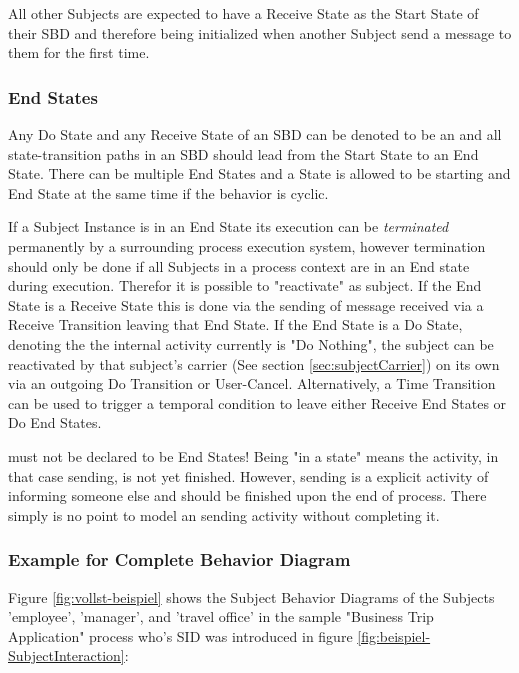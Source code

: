 All other Subjects are expected to have a Receive State as the Start State of their SBD and therefore being initialized when another Subject send a message to them for the first time.

\subsubsection{End States}
\label{sec:endStates}

Any Do State and any Receive State of an SBD can be denoted to be an  and all state-transition paths in an SBD should lead from the Start State to an End State. There can be multiple End States and a State is allowed to be starting and End State at the same time if the behavior is cyclic. 

If a Subject Instance is in an End State its execution can be \textit{terminated} permanently by a surrounding process execution system, however termination should only be done if all Subjects in a process context are in an End state during execution. Therefor it is possible to "reactivate" as subject. If the End State is a Receive State this is done via the sending of message received via a Receive Transition leaving that End State. If the End State is a Do State, denoting the the internal activity currently is "Do Nothing", the subject can be reactivated by that subject's carrier (See section \ref{sec:subjectCarrier}) on its own  via an outgoing Do Transition or User-Cancel. Alternatively, a Time Transition can be used to trigger a temporal condition to leave either Receive End States or Do End States.

 must not be declared to be End States! Being "in a state" means the activity, in that case sending, is not yet finished. However, sending is a explicit activity of informing someone else and should be finished upon the end of process. There simply is no point to model an sending activity without completing it. 

\subsubsection{Example for Complete Behavior Diagram}

Figure \ref{fig:vollst-beispiel} shows the Subject Behavior Diagrams of the Subjects 'employee', 'manager', and 'travel office' in the sample "Business Trip Application" process who's SID was introduced in  figure \ref{fig:beispiel-SubjectInteraction}:

